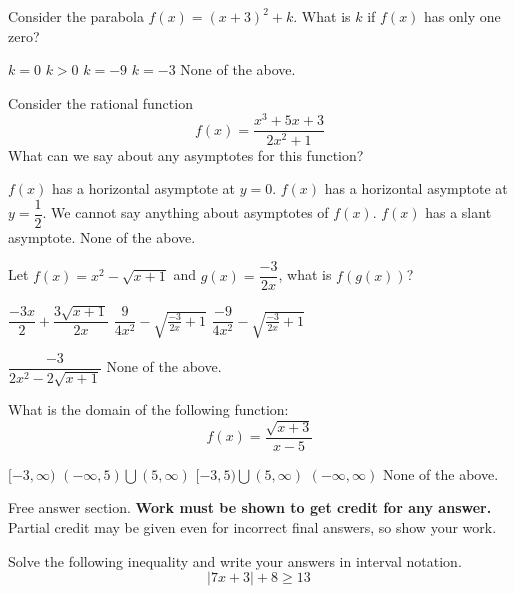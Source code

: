 \documentclass[addpoints,12pt]{exam}
\newcommand{\chooseone}{{\Large$\Circle$\ \ }}
\begin{document}
\begin{questions}
\question[3] 
Consider the parabola $f(x)=(x+3)^2+k$. What is $k$ if $f(x)$ has only one zero?
\begin{choices}
   \choice \chooseone $k=0$
   \choice \chooseone $k>0$
   \choice \chooseone $k=-9$
   \choice \chooseone $k=-3$
   \choice \chooseone None of the above.
\end{choices}

\newpage

\question[3] Consider the rational function 
\[
f(x)=\dfrac{x^3+5x+3}{2x^2+1}
\]
What can we say about any asymptotes for this function?
\begin{choices}
   \choice \chooseone $f(x)$ has a horizontal asymptote at $y=0$.
   \choice \chooseone $f(x)$ has a horizontal asymptote at $y=\dfrac{1}{2}$. 
   \choice \chooseone We cannot say anything about asymptotes of $f(x)$.
      \choice \chooseone $f(x)$ has a slant asymptote.
   \choice \chooseone None of the above.
\end{choices}

\question[3] Let $f(x)=x^2-\sqrt{x+1}$ and $g(x)=\dfrac{-3}{2x}$, what is $f(g(x))$?
\begin{choices}
   \choice \chooseone $\dfrac{-3x}{2}+\dfrac{3\sqrt{x+1}}{2x}$
      \choice \chooseone $\dfrac{9}{4x^2}-\sqrt{\frac{-3}{2x}+1}$
   \choice \chooseone $\dfrac{-9}{4x^2}-\sqrt{\frac{-3}{2x}+1}$

   \choice \chooseone $\dfrac{-3}{2x^2-2\sqrt{x+1}} $
   \choice \chooseone None of the above.
\end{choices}

\question[3] What is the domain of the following function:
\[
f(x)=\dfrac{\sqrt{x+3}}{x-5}
\]
\begin{choices}
   \choice \chooseone $[-3,\infty)$
   \choice \chooseone $(-\infty,5)\bigcup(5,\infty)$
   \choice \chooseone $[-3,5)\bigcup(5,\infty)$
   \choice \chooseone $(-\infty,\infty)$
   \choice \chooseone None of the above.
\end{choices}

\newpage
\hspace{-.5in}Free answer section. \textbf{Work must be shown to get credit for any answer.} Partial credit may be given even for incorrect final answers, so show your work.

\question[7] Solve the following inequality and write your answers in interval notation. 
\begin{equation*}
|7x + 3| + 8 \geq 13\,
\end{equation*}


\end{questions}
\end{document}
